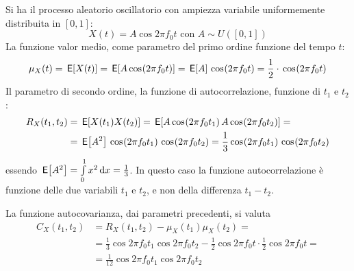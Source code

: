 \begin{esempio}
Si ha il processo aleatorio oscillatorio con ampiezza variabile uniformemente distribuita in $[0,1]$:
\[
	X(t)=A\cos{2\pi f_0 t}\text{ con }A\sim U([0,1])
\]
La funzione valor medio, come parametro del primo ordine funzione del tempo $t$:
\[
	\mu_X(t)=\,{\operatorname{\mathsf{E}}}\!\left[{X(t)}\right]=\,{\operatorname{\mathsf{E}}}\!\left[{A\,{\operatorname{cos}}^{}\!\left({2\pi f_0 t}\right)}\right]=\,{\operatorname{\mathsf{E}}}\!\left[{A}\right]\,{\operatorname{cos}}^{}\!\left({2\pi f_0 t}\right)=\frac{1}{2}\cdot\,{\operatorname{cos}}^{}\!\left({2\pi f_0 t}\right)
\]
Il parametro di secondo ordine, la funzione di autocorrelazione, funzione di $t_1$ e $t_2$:
\[
	\begin{split}
		R_X(t_1,t_2)&=\E{X(t_1)X(t_2)}=\E{A\cos{2\pi f_0 t_1}A\cos{2\pi f_0 t_2}}=\\&=\E{A^2}\cos{2\pi f_0 t_1}\cos{2\pi f_0 t_2}=\frac{1}{3}\cos{2\pi f_0 t_1}\cos{2\pi f_0 t_2}
	\end{split}
\]
essendo $\,{\operatorname{\mathsf{E}}}\!\left[{A^2}\right]=\int\limits_{0}^{1}{x^2}{\,\mathop{}\!\mathrm{d}{x}}=\frac{1}{3}$. In questo caso la funzione autocorrelazione è funzione delle due variabili $t_1$ e $t_2$, e non della differenza $t_1-t_2$.

La funzione autocovarianza, dai parametri precedenti, si valuta
\[
	\begin{split}
		C_X(t_1,t_2)&=R_X(t_1,t_2)-\mu_X(t_1)\mu_X(t_2)=\\
		&=\frac{1}{3}\cos{2\pi f_0 t_1}\cos{2\pi f_0 t_2}-\frac{1}{2}\cos{2\pi f_0 t}\cdot\frac{1}{2}\cos{2\pi f_0 t}=\\&=\frac{1}{12}\cos{2\pi f_0 t_1}\cos{2\pi f_0 t_2}
	\end{split}
\]
\end{esempio}

